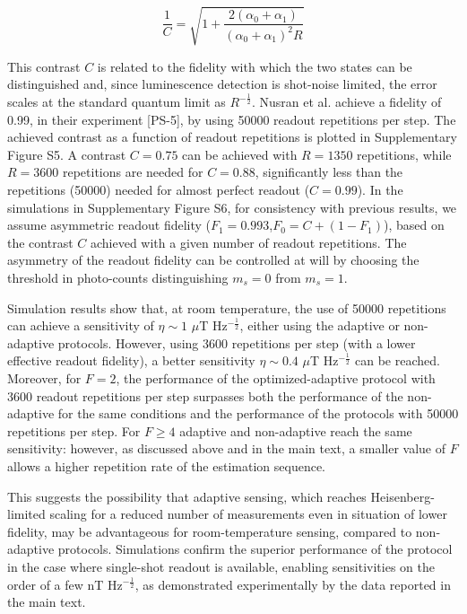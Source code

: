\documentclass{report}
\begin{document}
\begin{equation}
\frac{1}{C} = \sqrt{1+\frac{2(\alpha_0 + \alpha_1)}{(\alpha_0+\alpha_1)^2R}}
\end{equation}

This contrast $C$ is related to the fidelity with which the two states can be distinguished and, since luminescence detection is shot-noise limited, the error scales at the standard quantum limit as $R^{-\frac{1}{2}}$. Nusran et al. achieve a fidelity of 0.99, in their experiment [PS-5], by using 50000 readout repetitions per step. The achieved contrast as a function of readout repetitions is plotted in Supplementary Figure S5.
A contrast $C = 0.75$ can be achieved with $R = 1350$ repetitions, while $R = 3600$ repetitions are needed for $C = 0.88$, significantly less than the repetitions (50000) needed for almost perfect readout ($C = 0.99$). 
In the simulations in Supplementary Figure S6, for consistency with previous results, we assume asymmetric readout fidelity ($F_1 = 0.993$,$F_0 = C+(1-F_1)$), based on the contrast $C$ achieved with a given number of readout repetitions. The asymmetry of the readout fidelity can be controlled at will by choosing the threshold in photo-counts distinguishing $m_s = 0$ from $m_s = 1$.

Simulation results show that, at room temperature, the use of 50000 repetitions can achieve a sensitivity of $\eta \sim 1$ $\mu$T Hz$^{-\frac{1}{2}}$, either using the adaptive or non-adaptive protocols. However, using 3600 repetitions per step (with a lower effective readout fidelity), a better sensitivity $\eta \sim 0.4$ $\mu$T Hz$^{-\frac{1}{2}}$ can be reached. Moreover, for $F = 2$, the performance of the optimized-adaptive protocol with 3600 readout repetitions per step surpasses both the performance of the non-adaptive for the same conditions and the performance of the protocols with 50000 repetitions per step. For $F \geq 4$ adaptive and non-adaptive reach the same sensitivity: however, as discussed above and in the main text, a smaller value of $F$ allows a higher repetition rate of the estimation sequence.

This suggests the possibility that adaptive sensing, which reaches Heisenberg-limited scaling for a reduced number of measurements even in situation of lower fidelity, may be advantageous for room-temperature sensing, compared to non-adaptive protocols.
Simulations confirm the superior performance of the protocol in the case where single-shot readout is available, enabling sensitivities on the order of a few nT Hz$^{-\frac{1}{2}}$, as demonstrated experimentally by the data reported in the main text.
\end{document}
